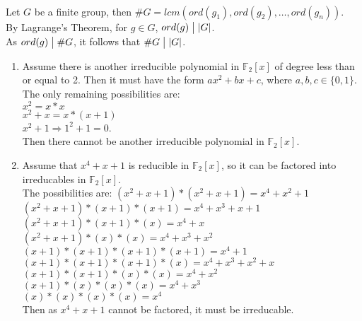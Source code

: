 \documentclass{assignment}
\begin{document}
\begin{problemlist}
\pbitem
\begin{problem}
\end{problem}
\begin{answer}
  \\
Let $G$ be a finite group, then $\# G = lcm(ord(g_1),ord(g_2),\ldots,ord(g_n))$.\\
By Lagrange's Theorem, for $g \in G$, $ord(g) \bigm| |G|$.\\
As $ord(g) \bigm| \# G$, it follows that $\#G \bigm| |G|$.
\end{answer}


\pbitem
\begin{problem}
\end{problem}
\begin{answer}
  \begin{enumerate}
  \item Assume there is another irreducible polynomial in $\mathbb{F}_2[x]$ of degree less than or equal to 2. Then it must have the form $ax^2 + bx + c$, where $a,b,c \in \{0,1\}$.\\
    The only remaining possibilities are:\\
    $x^2 = x*x$\\
    $x^2 + x = x * (x + 1)$\\
    $x^2 + 1 \Rightarrow 1^2 +1 = 0$.\\
    Then there cannot be another irreducible polynomial in $\mathbb{F}_2[x]$.
  \item Assume that $x^4 +x +1$ is reducible in $\mathbb{F}_2[x]$, so it can be factored into irreducables in $\mathbb{F}_2[x]$.\\
    The possibilities are:
    $(x^2 + x + 1) * (x^2 + x + 1) = x^4 + x^2 + 1$\\
    $(x^2 + x + 1) * (x + 1) * (x + 1) = x^4 + x ^ 3 + x + 1$\\
    $(x^2 + x + 1) * (x + 1) * (x) = x^4 + x$\\
    $(x^2 + x + 1) * (x) * (x) = x^4 + x ^ 3 + x^2$\\
    $(x + 1) * (x + 1) * (x + 1) * (x + 1) = x^4 + 1$\\
    $(x + 1) * (x + 1) * (x + 1) * (x) =x^4+x^3+x^2+x$\\
    $(x + 1) * (x + 1) * (x) * (x) = x^4 + x^2$\\
    $(x + 1) * (x) * (x) * (x) =x^4 + x^3$\\
    $(x) * (x) * (x) * (x) = x^4$\\
    Then as $x^4 +x +1$ cannot be factored, it must be irreducable.

\end{enumerate}
\end{answer}
\end{problemlist}
\end{document}
